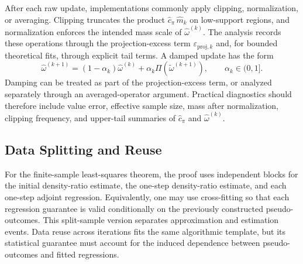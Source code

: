 \documentclass{article}
\newcommand{\mhat}{\widehat m}
\newcommand{\1}{\mathbf{1}}
\newcommand{\omegahat}{\widehat{\omega}}
\newcommand{\omegatilde}{\widetilde{\omega}}
\newcommand{\chat}{\widehat{c}_\pi}
\newcommand{\Proj}{\Pi}
\theoremstyle{plain}
\theoremstyle{definition}
\theoremstyle{remark}
\begin{document}
After each raw update, implementations commonly apply clipping, normalization, or averaging.
Clipping truncates the product $\chat\,\mhat_k$ on low-support regions, and normalization enforces the intended mass scale of $\omegahat^{(k)}$.
The analysis records these operations through the projection-excess term $\varepsilon_{\mathrm{proj},k}$ and, for bounded theoretical fits, through explicit tail terms.
A damped update has the form
\[
    \omegahat^{(k+1)}
    =
    (1-\alpha_k)\omegahat^{(k)}
    +
    \alpha_k\Proj(\omegatilde^{(k+1)}),
    \qquad \alpha_k\in(0,1].
\]
Damping can be treated as part of the projection-excess term, or analyzed separately through an averaged-operator argument.
Practical diagnostics should therefore include value error, effective sample size, mass after normalization, clipping frequency, and upper-tail summaries of $\chat$ and $\omegahat^{(k)}$.

\subsection{Data Splitting and Reuse}
\label{sec:data-splitting-reuse}

For the finite-sample least-squares theorem, the proof uses independent blocks for the initial density-ratio estimate, the one-step density-ratio estimate, and each one-step adjoint regression.
Equivalently, one may use cross-fitting so that each regression guarantee is valid conditionally on the previously constructed pseudo-outcomes.
This split-sample version separates approximation and estimation events.
Data reuse across iterations fits the same algorithmic template, but its statistical guarantee must account for the induced dependence between pseudo-outcomes and fitted regressions.
\end{document}
